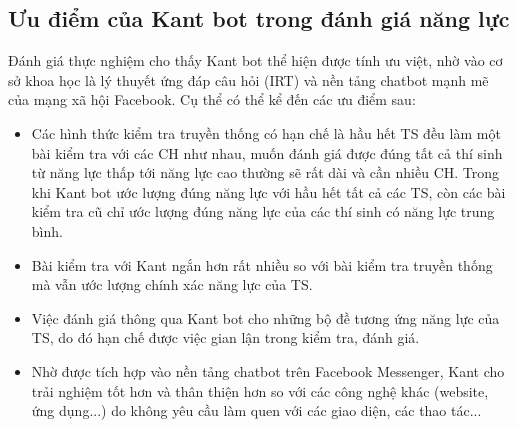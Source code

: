 \subsection{Ưu điểm của Kant bot trong đánh giá năng lực}
Đánh giá thực nghiệm cho thấy Kant bot thể hiện được tính ưu việt, nhờ vào cơ sở khoa học là lý thuyết ứng đáp câu hỏi (IRT) và nền tảng chatbot mạnh mẽ của mạng xã hội Facebook. Cụ thể có thể kể đến các ưu điểm sau:\begin{itemize}
\item Các hình thức kiểm tra truyền thống có hạn chế là hầu hết TS đều làm một bài kiểm tra với các CH như nhau, muốn đánh giá được đúng tất cả thí sinh từ năng lực thấp tới năng lực cao thường sẽ rất dài và cần nhiều CH. Trong khi Kant bot ước lượng đúng năng lực với hầu hết tất cả các TS, còn các bài kiểm tra cũ chỉ ước lượng đúng năng lực của các thí sinh có năng lực trung bình.
\item Bài kiểm tra với Kant ngắn hơn rất nhiều so với bài kiểm tra truyền thống mà vẫn ước lượng chính xác năng lực của TS.
\item Việc đánh giá thông qua Kant bot cho những bộ đề tương ứng năng lực của TS, do đó hạn chế được việc gian lận trong kiểm tra, đánh giá.
\item Nhờ được tích hợp vào nền tảng chatbot trên Facebook Messenger, Kant cho trải nghiệm tốt hơn và thân thiện hơn so với các công nghệ khác (website, ứng dụng...) do không yêu cầu làm quen với các giao diện, các thao tác...
\end{itemize}
